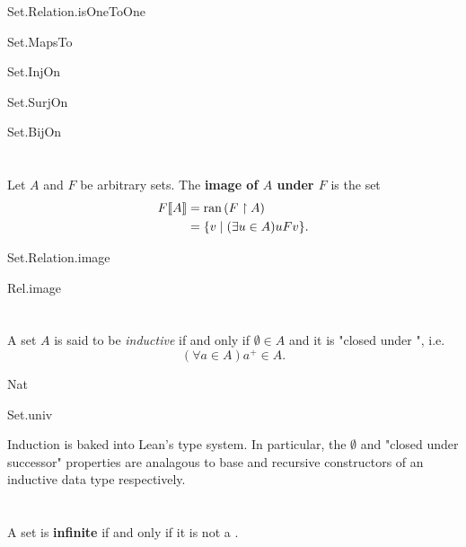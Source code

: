 \documentclass{report}
\begin{document}
    {Set.Relation.isOneToOne}

    {Set.MapsTo}

    {Set.InjOn}

    {Set.SurjOn}

    {Set.BijOn}

\section{}%

  Let $A$ and $F$ be arbitrary sets.
  The \textbf{image of $A$ under $F$} is the set
    \begin{align*}
      F\!\left\llbracket A\right\rrbracket
        & = \mathop{\text{ran}}{(F \restriction A)} \\
        & = \{v \mid (\exists u \in A) uFv\}.
    \end{align*}

    {Set.Relation.image}

    {Rel.image}

\section{}%

  A set $A$ is said to be \textit{inductive} if and only if $\emptyset \in A$
    and it is "closed under ", i.e.
    $$(\forall a \in A) a^+ \in A.$$

    {Nat}

    {Set.univ}

  \begin{note}
    Induction is baked into Lean's type system.
    In particular, the $\emptyset$ and "closed under successor" properties are
      analagous to base and recursive constructors of an inductive data type
      respectively.
  \end{note}

\section{}%

  A set is \textbf{infinite} if and only if it is not a
    .
\end{document}
